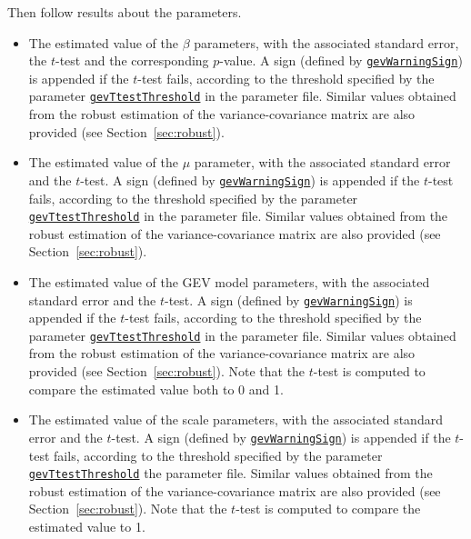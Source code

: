 \documentclass[12pt]{memoir}
\begin{document}
   Then follow results about the parameters.
   \begin{itemize}
      \item The estimated value of the $\beta$ parameters, with the
         associated standard error, the $t$-test and the corresponding $p$-value. A sign (defined by \hyperlink{gevWarningSign}{\texttt{gevWarningSign}}) is
         appended if the $t$-test fails, according to the threshold specified
         by the parameter
         \hyperlink{gevTtestThreshold}{\texttt{gevTtestThreshold}} in
         the parameter file. Similar values obtained from the robust estimation
         of the variance-covariance matrix are also provided (see Section~\ref{sec:robust}).

      \item The estimated value of the $\mu$ parameter, with the associated
         standard error and the $t$-test. A sign (defined by \hyperlink{gevWarningSign}{\texttt{gevWarningSign}}) is appended if the
         $t$-test fails, according to the threshold specified by the parameter
         \hyperlink{gevTtestThreshold}{\texttt{gevTtestThreshold}} in
         the parameter file. Similar values obtained from the robust estimation
         of the variance-covariance matrix are also provided (see Section~\ref{sec:robust}).
      \item The estimated value of the GEV model parameters, with the
          associated standard error and the $t$-test. A sign (defined by \hyperlink{gevWarningSign}{\texttt{gevWarningSign}}) is
         appended if the $t$-test fails, according to the threshold specified
         by the parameter
         \hyperlink{gevTtestThreshold}{\texttt{gevTtestThreshold}} in
         the parameter file. Similar values obtained from the robust estimation
         of the variance-covariance matrix are also provided (see
         Section~\ref{sec:robust}). Note that the
         $t$-test is computed to compare the estimated value both to 0 and 1.
      \item The estimated value of the scale parameters, with the associated
         standard error and the $t$-test. A sign (defined by \hyperlink{gevWarningSign}{\texttt{gevWarningSign}}) is appended if the
         $t$-test fails, according to the threshold specified by the parameter
         \hyperlink{gevTtestThreshold}{\texttt{gevTtestThreshold}} the parameter file. Similar values obtained from the robust estimation
         of the variance-covariance matrix are also provided (see
         Section~\ref{sec:robust}). Note that the
         $t$-test is computed to compare the estimated value to 1.

\end{itemize}
\end{document}
